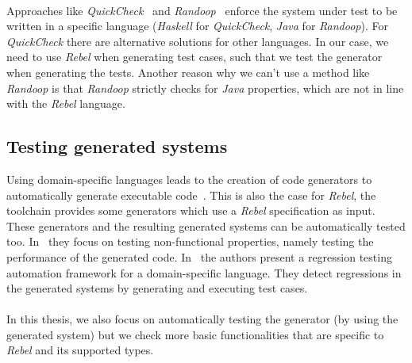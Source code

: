 \\
Approaches like \textit{QuickCheck}~\cite{claessen2011quickcheck} and
\textit{Randoop}~\cite{pacheco2007randoop} enforce the system under test to be
written in a specific language (\textit{Haskell} for \textit{QuickCheck},
\textit{Java} for \textit{Randoop}). For \textit{QuickCheck} there are
alternative solutions for other languages. In our case, we need to use
\textit{Rebel} when generating test cases, such that we test the generator when
generating the tests. Another reason why we can't use a method like
\textit{Randoop} is that \textit{Randoop} strictly checks for \textit{Java}
properties, which are not in line with the \textit{Rebel} language.

\subsection{Testing generated systems}
Using domain-specific languages leads to the creation of code generators to automatically generate executable code~\cite{boussaa2016automatic}. This is also the case for \textit{Rebel}, the toolchain provides some generators which use a \textit{Rebel} specification as input. These generators and the resulting generated systems can be automatically tested too. In~\cite{boussaa2016automatic} they focus on testing non-functional properties, namely testing the performance of the generated code. In~\cite{makki2016automated} the authors present a regression testing automation framework for a domain-specific language. They detect regressions in the generated systems by generating and executing test cases.\\
\\
In this thesis, we also focus on automatically testing the generator (by using the generated system) but we check more basic functionalities that are specific to \textit{Rebel} and its supported types.

